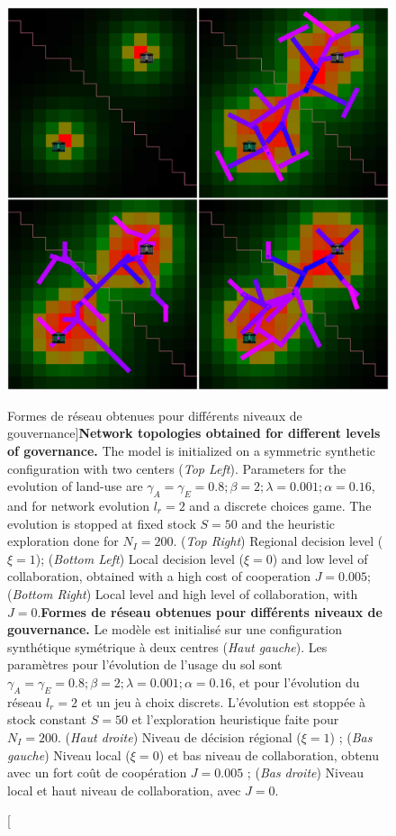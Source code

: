 \begin{figure}
	\includegraphics[width=\linewidth]{Figures/Final/7-3-3-fig-lutecia-governance.jpg}
	\caption[Network topologies obtained for different levels of governance][Formes de réseau obtenues pour différents niveaux de gouvernance]{\textbf{Network topologies obtained for different levels of governance.} The model is initialized on a symmetric synthetic configuration with two centers (\textit{Top Left}). Parameters for the evolution of land-use are $\gamma_A = \gamma_E = 0.8 ; \beta = 2 ; \lambda = 0.001 ; \alpha = 0.16$, and for network evolution $l_r = 2$ and a discrete choices game. The evolution is stopped at fixed stock $S = 50$ and the heuristic exploration done for $N_I = 200$. (\textit{Top Right}) Regional decision level ($\xi = 1$); (\textit{Bottom Left}) Local decision level ($\xi = 0$) and low level of collaboration, obtained with a high cost of cooperation $J=0.005$; (\textit{Bottom Right}) Local level and high level of collaboration, with $J=0$.\label{fig:lutecia:governance}}{\textbf{Formes de réseau obtenues pour différents niveaux de gouvernance.} Le modèle est initialisé sur une configuration synthétique symétrique à deux centres (\textit{Haut gauche}). Les paramètres pour l'évolution de l'usage du sol sont $\gamma_A = \gamma_E = 0.8 ; \beta = 2 ; \lambda = 0.001 ; \alpha = 0.16$, et pour l'évolution du réseau $l_r = 2$ et un jeu à choix discrets. L'évolution est stoppée à stock constant $S = 50$ et l'exploration heuristique faite pour $N_I = 200$. (\textit{Haut droite}) Niveau de décision régional ($\xi = 1$) ; (\textit{Bas gauche}) Niveau local ($\xi = 0$) et bas niveau de collaboration, obtenu avec un fort coût de coopération $J=0.005$ ; (\textit{Bas droite}) Niveau local et haut niveau de collaboration, avec $J=0$.\label{fig:lutecia:governance}}
\end{figure}

